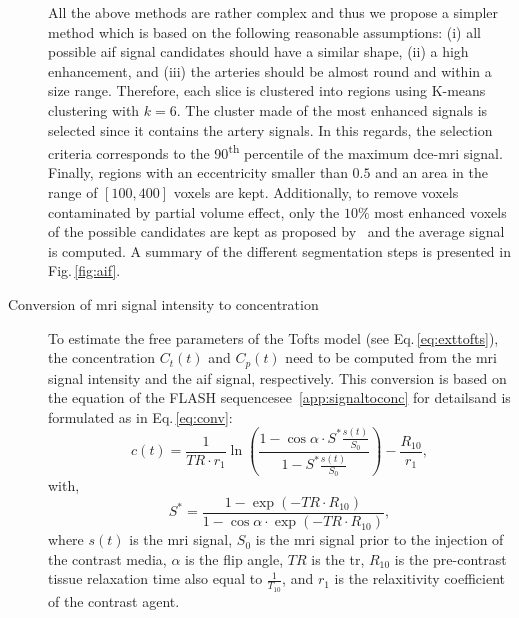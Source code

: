 \begin{description}
    All the above methods are rather complex and thus we propose a simpler method which is based on the following reasonable assumptions:
    (i) all possible \ac{aif} signal candidates should have a similar shape,
    (ii) a high enhancement, and
    (iii) the arteries should be almost round and within a size range.
    Therefore, each slice is clustered into regions using K-means clustering with $k=6$.
    The cluster made of the most enhanced signals is selected since it contains the artery signals.
    In this regards, the selection criteria corresponds to the 90\textsuperscript{th} percentile of the maximum \ac{dce}-\ac{mri} signal.
    Finally, regions with an eccentricity smaller than $0.5$ and an area in the range of $[100, 400]$ voxels are kept.
    Additionally, to remove voxels contaminated by partial volume effect, only the $10\%$ most enhanced voxels of the possible candidates are kept as proposed by~\citep{schabel2008uncertainty} and the average signal is computed.
    A summary of the different segmentation steps is presented in Fig.\,\ref{fig:aif}.
    \item[Conversion of \ac{mri} signal intensity to concentration] To estimate the free parameters of the Tofts model (see Eq.\,\eqref{eq:exttofts}), the concentration $C_t(t)$ and $C_p(t)$ need to be computed from the \ac{mri} signal intensity and the \ac{aif} signal, respectively.
      This conversion is based on the equation of the FLASH sequence\textemdash see~\ref{app:signaltoconc} for details\textemdash and is formulated as in Eq.\,\eqref{eq:conv}:
      \begin{equation}
        c(t) = \frac{1}{TR \cdot r_1} \ln\left( \frac{1 - \cos \alpha \cdot S^{*}\frac{s(t)}{S_0}}{1 - S^{*}\frac{s(t)}{S_0}} \right) - \frac{R_{10}}{r_1} ,
        \label{eq:conv}
      \end{equation}
      \noindent with,
      \begin{equation}
        S^{*} = \frac{1 - \exp(- TR \cdot R_{10})}{1 - \cos \alpha \cdot \exp(- TR \cdot R_{10})} ,
        \label{eq:sstarconv}
      \end{equation}
      \noindent where $s(t)$ is the \ac{mri} signal, $S_0$ is the \ac{mri} signal prior to the injection of the contrast media, $\alpha$ is the flip angle, $TR$ is the \acf{tr}, $R_{10}$ is the pre-contrast tissue relaxation time also equal to $\frac{1}{T_{10}}$, and $r_1$ is the relaxitivity coefficient of the contrast agent.


\end{description}
